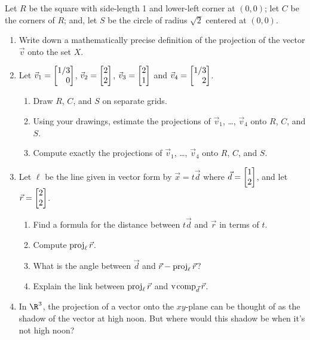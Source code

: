

Let $R$ be the square with side-length 1 and lower-left corner at $(0,0)$;
		let $C$ be the corners of $R$; and, let $S$ be the circle of radius $\sqrt{2}$ centered
		at $(0,0)$.

\begin{enumerate}
	\item Write down a mathematically precise definition of the projection of the vector $\vec v$ onto the set $X$.
	\item Let $\vec v_1=\mat{1/3\\0}$, $\vec v_2=\mat{2\\2}$, $\vec v_3=\mat{2\\1}$ and $\vec v_4=\mat{1/3\\2}$.
	\begin{enumerate}
		\item Draw $R$, $C$, and $S$ on separate grids.
		\item Using your drawings, estimate the projections of $\vec v_1$, \ldots, $\vec v_4$ onto $R$, $C$, and $S$.
		\item Compute exactly the projections of $\vec v_1$, \ldots, $\vec v_4$ onto $R$, $C$, and $S$.
	\end{enumerate}


	\item Let $\ell$ be the line given in vector form by $\vec x=t\vec d$ where $\vec d=\mat{1\\2}$, and let $\vec r=\mat{2\\2}$.
		\begin{enumerate}
			\item Find a formula for the distance between $t\vec d$ and $\vec r$ in terms of $t$.
			\item Compute $\operatorname{proj}_\ell \vec r$.
			\item What is the angle between $\vec d$ and $\vec r-\operatorname{proj}_\ell \vec r$?
			\item Explain the link between $\operatorname{proj}_\ell \vec r$ and $\operatorname{\operatorname{v\hspace{1pt}comp}}_{\vec d}\vec r$.
		\end{enumerate}

	\item In $\R^3$, the projection of a vector onto the $xy$-plane can be thought of as the shadow
		of the vector at high noon. But where would this shadow be when it's not high noon?\


\end{enumerate}
